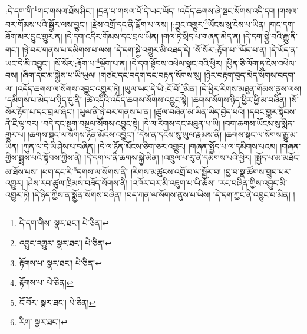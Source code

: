 :དེ་དག་གི་\footnote{དེ་དག་གིས་  སྣར་ཐང་།  པེ་ཅིན། }གང་གསལ་ཐོས་ཤིང་། །དྲན་པ་གསལ་པོ་དེ་ཡང་ཡོད། །འདོད་ཆགས་ཞེ་སྡང་སོགས་འདི་དག །གསལ་བར་གོམས་པའི་སྦྱོར་ལས་བྱུང་། །རྗེས་འགྲོ་དང་ནི་ལྡོག་པ་ལས། །:བྱུང་འགྱུར་\footnote{འབྱུང་འགྱུར་  སྣར་ཐང་།  པེ་ཅིན། }ཡོངས་སུ་ངེས་པ་ཡིན། །གང་དག་ཐོག་མར་བྱུང་གྱུར་ན། །དེ་དག་འདིར་གོམས་དང་བྲལ་ཡིན། །གལ་ཏེ་སྲིད་པ་གཞན་མེད་ན། །དེ་དག་སྐྱེ་བའི་རྒྱུ་ནི་གང་། །ཉེ་བར་གནས་པ་དམིགས་པ་ལས། །དེ་དག་སྐྱེ་འགྱུར་མི་འཐད་དེ། །སོ་སོར་:རྟོག་པ་\footnote{རྟོགས་པ་  སྣར་ཐང་།  པེ་ཅིན། }ཡོད་པ་ན། །དེ་ཡོད་ན་ཡང་དེ་མི་འབྱུང་། །སོ་སོར་:རྟོག་པ་\footnote{རྟོགས་པ་  པེ་ཅིན། }ལྡོག་པ་ན། །དེ་དག་སྟོབས་འཕེལ་སྣང་བའི་ཕྱིར། །ཕྱིན་ཅི་ལོག་ཏུ་ངེས་འཕེལ་བས། །ཞིག་དང་མ་སྐྱེས་པ་ཡི་ཡུལ། །གཙང་དང་བདག་དང་བརྟན་སོགས་སུ། །ཉེར་བརྟག་བུད་མེད་སོགས་བདག་ལ། །འདོད་ཆགས་ལ་སོགས་འབྱུང་འགྱུར་ཏེ། །ཡུལ་ཡང་དེ་ཡི་:ངོ་བོ་\footnote{ངོ་བོར་  སྣར་ཐང་།  པེ་ཅིན། }མིན། །དེ་ཕྱིར་རིགས་མཐུན་གོམས་ནུས་ལས། །དམིགས་པ་མེད་པ་ཉིད་དུ་ནི། །ཚེ་འདིའི་འདོད་ཆགས་སོགས་འབྱུང་སྟེ། །ཆགས་སོགས་ཉིད་ཕྱིར་ཕྱི་མ་བཞིན། །སོ་སོར་རྟོག་པ་དང་བྲལ་ཞིང་། །ཡུལ་ནི་ཉེ་བར་གནས་པ་ན། །ཚུལ་བཞིན་མ་ཡིན་ཡིད་བྱེད་པའི། །དབང་གྱུར་སྟོབས་ནི་ཇི་ལྟ་བར། །བདེ་དང་སྡུག་བསྔལ་སོགས་འབྱུང་སྟེ། །དེ་ལ་རིགས་དང་མཐུན་པ་ཡི། །བག་ཆགས་ཡོངས་སུ་སྨིན་གྱུར་པ། །ཆགས་སྡང་ལ་སོགས་ཉོན་མོངས་འབྱུང་། །དེས་ན་དངོས་སུ་ཡུལ་རྣམས་ནི། །ཆགས་སྡང་ལ་སོགས་རྒྱུ་མ་ཡིན། །ཀུན་ལ་དེ་ཡི་ཤེས་པ་བཞིན། །དེ་ལ་ཉོན་མོངས་ཅིག་ཅར་འགྱུར། །གཞན་སྤྱོད་པ་ལ་དམིགས་པའམ། །གཞན་གྱིས་སྨྲས་པའི་སྟོབས་ཀྱིས་ནི། །དེ་དག་ལ་ནི་ཆགས་སྐྱེ་མིན། །འཁྲུལ་པ་རུ་ནི་དམིགས་པའི་ཕྱིར། །སྤྱོད་པ་མ་མཐོང་མ་ཐོས་པས། །ཕག་དང་རི་\footnote{རིག་  སྣར་ཐང་། }དྭགས་ལ་སོགས་ནི། །རིགས་མཚུངས་འགྲོ་བ་ལ་སྦྱོར་བ། །བྱ་བ་སྣ་ཚོགས་གྲུབ་པར་འགྱུར། །ཤེས་རབ་ཚུལ་ཁྲིམས་བཟོད་སོགས་ནི། །འཁོར་བར་མི་འཇུག་པ་ཡི་ཆོས། །རང་བཞིན་གྱིས་འབྱུང་མི་འགྱུར་ཏེ། །དེ་ཉིད་ཀྱིས་ན་སྨྱོན་སོགས་བཞིན། །བད་ཀན་ལ་སོགས་ནུས་པ་ཡིས། །དེ་དག་ཀྱང་ནི་འབྱུང་བ་མིན། །

